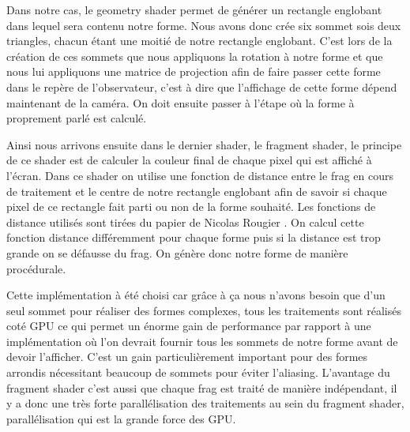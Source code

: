 \documentclass[12pt]{article}
\begin{document}
Dans notre cas, le geometry shader permet de générer un rectangle englobant dans lequel sera contenu notre forme. Nous avons donc crée six sommet sois deux triangles, chacun étant une moitié de notre rectangle englobant. C'est lors de la création de ces sommets que nous appliquons la rotation à notre forme et que nous lui appliquons une matrice de projection afin de faire passer cette forme dans le repère de l'observateur, c'est à dire que l'affichage de cette forme dépend maintenant de la caméra. On doit ensuite passer à l'étape où la forme à proprement parlé est calculé.

Ainsi nous arrivons ensuite dans le dernier shader, le fragment shader, le principe de ce shader est de calculer la couleur final de chaque pixel qui est affiché à l'écran. Dans ce shader on utilise une fonction de distance entre le \gls{frag} en cours de traitement et le centre de notre rectangle englobant afin de savoir si chaque pixel de ce rectangle fait parti ou non de la forme souhaité. Les fonctions de distance utilisés sont tirées du papier de Nicolas Rougier \cite{Rougier}. On calcul cette fonction distance différemment pour chaque forme puis si la distance est trop grande on se défausse du \gls{frag}. On génère donc notre forme de manière procédurale.

Cette implémentation à été choisi car grâce à ça nous n'avons besoin que d'un seul sommet pour réaliser des formes complexes, tous les traitements sont réalisés coté GPU ce qui permet un énorme gain de performance par rapport à une implémentation où l'on devrait fournir tous les sommets de notre forme avant de devoir l'afficher. C'est un gain particulièrement important pour des formes arrondis nécessitant beaucoup de sommets pour éviter l'aliasing.
L'avantage du fragment shader c'est aussi que chaque \gls{frag} est traité de manière indépendant, il y a donc une très forte parallélisation des traitements au sein du fragment shader, parallélisation qui est la grande force des GPU.
\end{document}
